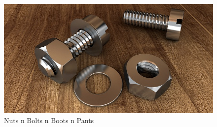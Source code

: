 \documentclass[10pt, a4paper, twocolumn]{article} %
\begin{document}




\begin{figure}
	\includegraphics[width=\linewidth]{screw-1924174_640.jpg} %
	\caption{Nuts n Bolts n Boots n Pants} %
	\label{screw-1924174_640} %
\end{figure}
\end{document}
